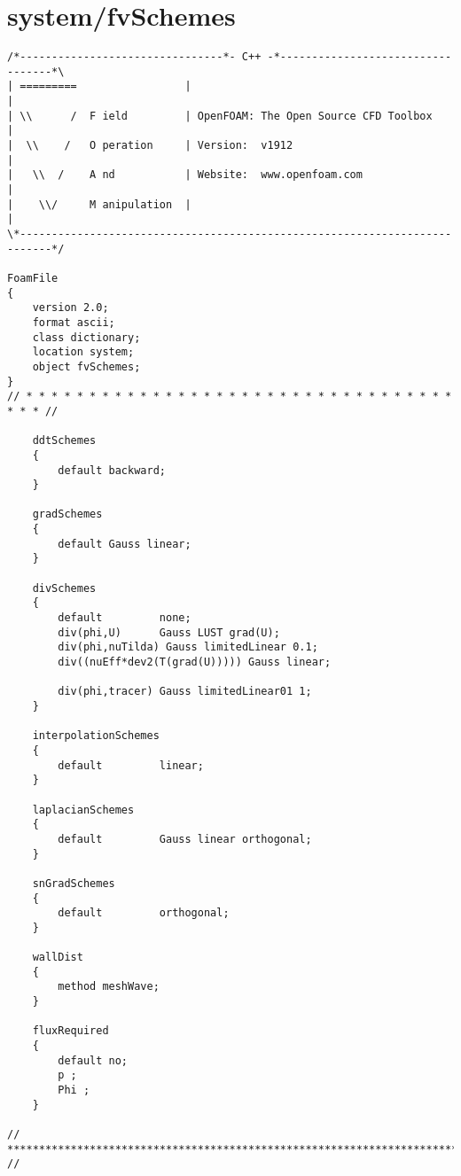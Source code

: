 \section{system/fvSchemes}
\begin{lstlisting}
/*--------------------------------*- C++ -*----------------------------------*\
| =========                 |                                                 |
| \\      /  F ield         | OpenFOAM: The Open Source CFD Toolbox           |
|  \\    /   O peration     | Version:  v1912                                 |
|   \\  /    A nd           | Website:  www.openfoam.com                      |
|    \\/     M anipulation  |                                                 |
\*---------------------------------------------------------------------------*/

FoamFile
{
    version 2.0;
    format ascii;
    class dictionary;
    location system;
    object fvSchemes;
}
// * * * * * * * * * * * * * * * * * * * * * * * * * * * * * * * * * * * * * //

    ddtSchemes
    {
        default	backward;
    }

    gradSchemes
    {
        default Gauss linear;
    }

    divSchemes
	{
		default         none;
		div(phi,U)      Gauss LUST grad(U);
		div(phi,nuTilda) Gauss limitedLinear 0.1;
		div((nuEff*dev2(T(grad(U))))) Gauss linear;
		
		div(phi,tracer) Gauss limitedLinear01 1;
	}

    interpolationSchemes
    {
        default			linear;
    }

    laplacianSchemes
    {
        default         Gauss linear orthogonal;
    }

    snGradSchemes
    {
        default			orthogonal;
    }

	wallDist
    {
        method meshWave;
    }

    fluxRequired
    {
        default no;
        p ;
        Phi ;
    }

// ************************************************************************* //

\end{lstlisting}

